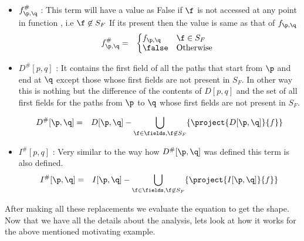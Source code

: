 \begin{itemize}

 \item $f_{\p,\q}^{\#}$ :
	  This term will have a value as False if  $\f$ is not accessed at any point in function \F, i.e $\f \not \in S_F$ 
If its present then the value is same as that of $f_{\p,\q}$
\begin{eqnarray*}
f_{\p,\q}^{\#} &=&  \left \{ \begin{array}{@{}ll}
                       f_{\p,\q}  & \f \in S_F  \\
			 \false & \mbox{Otherwise}
                       \end{array} \right.
\end{eqnarray*}

  \item ${D^{\#}[p,q]}$ :
      It contains the first field of all the paths that start from $\p$ and end at $\q$ except those whose first fields are not present in $S_F$.
In other way this is nothing but the difference of the contents of $D[p,q]$ and the set of all first fields for the paths from $\p$ to $\q$ whose
first fields are not present in $S_F$.

\begin{eqnarray*}
D^{\#}[\p, \q] &=& D[\p, \q] -\bigcup_{ \f \in \fields,\f \not \in S_F } \{  \project{D[\p,\q]}{f}         \}
\end{eqnarray*}

\item ${I^{\#}[p,q]}$ :
      Very similar to the way how $D^{\#}[\p, \q]$ was defined this term is also defined.      
\begin{eqnarray*}
I^{\#}[\p, \q] &=& I[\p, \q] - \bigcup_{ \f \in \fields,\f \not \in S_F } \{  \project{I[\p,\q]}{f}         \}
\end{eqnarray*}
\end{itemize}

After making all these replacements we evaluate the equation to get the shape.
Now that we have all the details about the analysis, lets look at how it works for the above mentioned motivating example.


